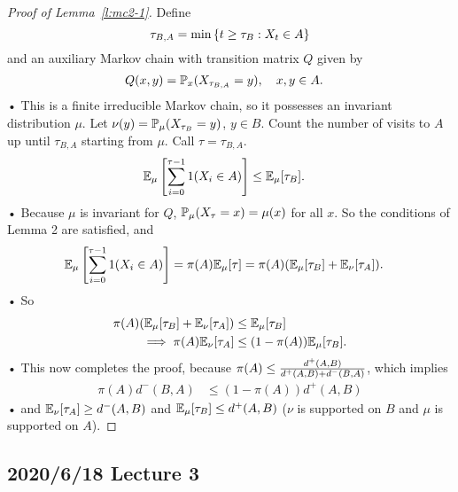 \begin{proof}[Proof of Lemma~\ref{l:mc2-1}]
Define $$\tau_{B,A} = \min\left\{{t\ge \tau_B}:{X_t\in A}\right\}$$
and an auxiliary Markov chain with transition matrix $Q$ given by 
\begin{align*}
Q(x,y) &= \mathbb{P}_x(X_{\tau_{B,A}}=y), \quad x,y\in A.
\end{align*}•
This is a finite irreducible Markov chain, so it possesses an invariant distribution $\mu$. Let $\nu(y)=\mathbb{P}_\mu(X_{\tau_B}=y)$, $y\in B$.
Count the number of visits to $A$ up until $\tau_{B,A}$ starting from $\mu$. Call $\tau=\tau_{B,A}$.
\begin{align*}
\mathbb{E}_\mu\left[ {\sum_{i=0}^{\tau-1} 1(X_i\in A)} \right]&\le \mathbb{E}_\mu[\tau_B].
\end{align*}•
Because $\mu$ is invariant for $Q$, $\mathbb{P}_\mu(X_\tau=x)=\mu(x)$ for all $x$.
So the conditions of Lemma 2 are satisfied, and
\begin{align*}
\mathbb{E}_\mu\left[ {\sum_{i=0}^{\tau-1} 1(X_i\in A)} \right]&= \pi(A) \mathbb{E}_\mu[\tau] = \pi(A) (\mathbb{E}_\mu[\tau_B]+\mathbb{E}_\nu[\tau_A]). 
\end{align*}•
So
\begin{align*}
\pi(A) (\mathbb{E}_\mu[\tau_B] + \mathbb{E}_\nu[\tau_A]) &\le \mathbb{E}_\mu[\tau_B]\\
\implies
\pi(A) \mathbb{E}_\nu [\tau_A] &\le (1-\pi(A))\mathbb{E}_\mu[\tau_B]. 
\end{align*}•
This now completes the proof, because $\pi(A) \le \frac{d^+(A,B)}{d^+(A,B) + d^-(B,A)}$, which implies
\begin{align*}
\pi(A) d^-(B,A) &\le (1-\pi(A))d^+(A,B)
\end{align*}•
and $\mathbb{E}_\nu[\tau_A]\ge d^-(A,B)$ and $\mathbb{E}_\mu[\tau_B]\le d^+(A,B)$ ($\nu$ is supported on $B$ and $\mu$ is supported on $A$). 
\end{proof}

\subsection*{2020/6/18 Lecture 3}


